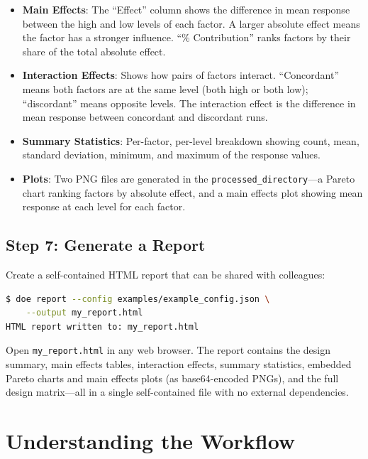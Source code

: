 \documentclass[11pt]{book}
\begin{document}
\begin{keypoint}
\begin{itemize}
  \item \textbf{Main Effects}: The ``Effect'' column shows the difference in mean response between the high and low levels of each factor. A larger absolute effect means the factor has a stronger influence. ``\% Contribution'' ranks factors by their share of the total absolute effect.
  \item \textbf{Interaction Effects}: Shows how pairs of factors interact. ``Concordant'' means both factors are at the same level (both high or both low); ``discordant'' means opposite levels. The interaction effect is the difference in mean response between concordant and discordant runs.
  \item \textbf{Summary Statistics}: Per-factor, per-level breakdown showing count, mean, standard deviation, minimum, and maximum of the response values.
  \item \textbf{Plots}: Two PNG files are generated in the \texttt{processed\_directory}---a Pareto chart ranking factors by absolute effect, and a main effects plot showing mean response at each level for each factor.
\end{itemize}
\end{keypoint}

\section{Step 7: Generate a Report}

Create a self-contained HTML report that can be shared with colleagues:

\begin{lstlisting}[language=bash]
$ doe report --config examples/example_config.json \
    --output my_report.html
HTML report written to: my_report.html
\end{lstlisting}

Open \texttt{my\_report.html} in any web browser. The report contains the design summary, main effects tables, interaction effects, summary statistics, embedded Pareto charts and main effects plots (as base64-encoded PNGs), and the full design matrix---all in a single self-contained file with no external dependencies.


\chapter{Understanding the Workflow}
\label{ch:workflow}
\end{document}
